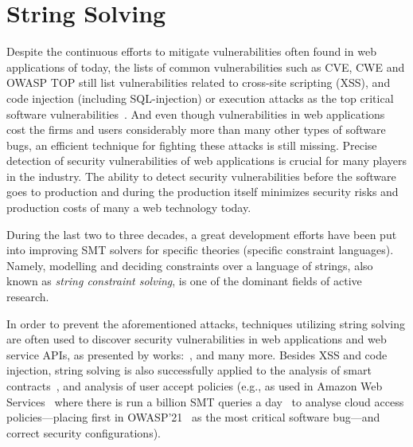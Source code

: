 \chapter{String Solving}
\label{chap:string_solving}


Despite the continuous efforts to mitigate vulnerabilities often found in web applications of today, the lists of common vulnerabilities such as CVE, CWE and OWASP TOP still list vulnerabilities related to cross-site scripting (XSS), and code injection (including SQL-injection) or execution attacks as the top critical software vulnerabilities~\cite{OWASP13,OWASP17,OWASP21,cwe-top-25-2022, cwe-top-25-2023}.
And even though vulnerabilities in web applications cost the firms and users considerably more than many other types of software bugs, an efficient technique for fighting these attacks is still missing.
Precise detection of security vulnerabilities of web applications is crucial for many players in the industry.
The ability to detect security vulnerabilities before the software goes to production and during the production itself minimizes security risks and production costs of many a web technology today.

During the last two to three decades, a great development efforts have been put into improving SMT solvers for specific theories (specific constraint languages).
Namely, modelling and deciding constraints over a language of strings, also known as \emph{string constraint solving}, is one of the dominant fields of active research.

In order to prevent the aforementioned attacks, techniques utilizing string solving are often used to discover security vulnerabilities in web applications and web service APIs, as presented by works:~\cite{String_constraints_with_concatenation_and_transducers_solved_efficiently, Composing_Static_and_Dynamic_Analysis_to_Validate_Sanitization_in_Web_Applications, Satisfiability_Modulo_Theories_Introduction_and_Applications, Simple_linear_string_constraints,Z3-str_a_z3-based_string_solver_for_web_application_analysis,S3_A_Symbolic_String_Solver_for_Vulnerability_Detection_in_Web_Applications}, and many more.
Besides XSS and code injection, string solving is also successfully applied to the analysis of smart contracts~\cite{AltBHS22}, and analysis of user accept policies (e.g., as used in Amazon Web Services~\cite{hadarean_mosca, stringsAWS18} where there is run a billion SMT queries a day~\cite{Rungta2022} to analyse cloud access policies---placing first in OWASP'21~\cite{OWASP21} as the most critical software bug---and correct security configurations).

